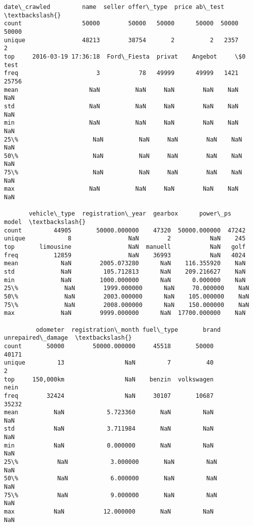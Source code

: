 \documentclass[11pt]{article}
\makeatletter
\newcommand{\boxspacing}{\kern\kvtcb@left@rule\kern\kvtcb@boxsep}
\newcommand{\prompt}[4]{
        {\ttfamily\llap{{\color{#2}[#3]:\hspace{3pt}#4}}\vspace{-\baselineskip}}
    }
\makeatother
\begin{document}
            \begin{tcolorbox}[breakable, size=fbox, boxrule=.5pt, pad at break*=1mm, opacityfill=0]
\prompt{Out}{outcolor}{5}{\boxspacing}
\begin{Verbatim}[commandchars=\\\{\}]
               date\_crawled         name  seller offer\_type  price ab\_test  \textbackslash{}
count                 50000        50000   50000      50000  50000   50000
unique                48213        38754       2          2   2357       2
top     2016-03-19 17:36:18  Ford\_Fiesta  privat    Angebot     \$0    test
freq                      3           78   49999      49999   1421   25756
mean                    NaN          NaN     NaN        NaN    NaN     NaN
std                     NaN          NaN     NaN        NaN    NaN     NaN
min                     NaN          NaN     NaN        NaN    NaN     NaN
25\%                     NaN          NaN     NaN        NaN    NaN     NaN
50\%                     NaN          NaN     NaN        NaN    NaN     NaN
75\%                     NaN          NaN     NaN        NaN    NaN     NaN
max                     NaN          NaN     NaN        NaN    NaN     NaN

       vehicle\_type  registration\_year  gearbox      power\_ps  model  \textbackslash{}
count         44905       50000.000000    47320  50000.000000  47242
unique            8                NaN        2           NaN    245
top       limousine                NaN  manuell           NaN   golf
freq          12859                NaN    36993           NaN   4024
mean            NaN        2005.073280      NaN    116.355920    NaN
std             NaN         105.712813      NaN    209.216627    NaN
min             NaN        1000.000000      NaN      0.000000    NaN
25\%             NaN        1999.000000      NaN     70.000000    NaN
50\%             NaN        2003.000000      NaN    105.000000    NaN
75\%             NaN        2008.000000      NaN    150.000000    NaN
max             NaN        9999.000000      NaN  17700.000000    NaN

         odometer  registration\_month fuel\_type       brand unrepaired\_damage  \textbackslash{}
count       50000        50000.000000     45518       50000             40171
unique         13                 NaN         7          40                 2
top     150,000km                 NaN    benzin  volkswagen              nein
freq        32424                 NaN     30107       10687             35232
mean          NaN            5.723360       NaN         NaN               NaN
std           NaN            3.711984       NaN         NaN               NaN
min           NaN            0.000000       NaN         NaN               NaN
25\%           NaN            3.000000       NaN         NaN               NaN
50\%           NaN            6.000000       NaN         NaN               NaN
75\%           NaN            9.000000       NaN         NaN               NaN
max           NaN           12.000000       NaN         NaN               NaN


\end{Verbatim}
\end{tcolorbox}
\end{document}
